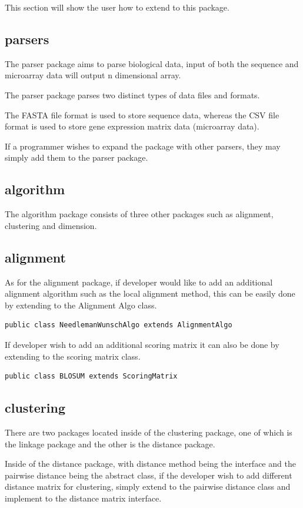 \documentclass[]{final_report}
\begin{document}
This section will show the user how to extend to this package.
\subsection{parsers}
The parser package aims to parse biological data, input of both the sequence and microarray data will output n dimensional array.

The parser package parses two distinct types of data files and formats.

The FASTA file format is used to store sequence data, whereas the CSV file format is used to store gene expression matrix data (microarray data).

If a programmer wishes to expand the package with other parsers, they may simply add them to the parser package.
\subsection{algorithm}
The algorithm package consists of three other packages such as alignment, clustering and dimension.
\subsection{alignment}
As for the alignment package, if developer would like to add an additional alignment algorithm such as the local alignment method, this can be easily done by extending to the Alignment Algo class.
\begin{verbatim}
public class NeedlemanWunschAlgo extends AlignmentAlgo
\end{verbatim}
If developer wish to add an additional scoring matrix it can also be done by extending to the scoring matrix class.
\begin{verbatim}
public class BLOSUM extends ScoringMatrix 
\end{verbatim}
\subsection{clustering}
There are two packages located inside of the clustering package, one of which is the linkage package and the other is the distance package.

Inside of the distance package, with distance method being the interface and the pairwise distance being the abstract class, if the developer wish to add different distance matrix for clustering, simply extend to the pairwise distance class and implement to the distance matrix interface.
\end{document}
